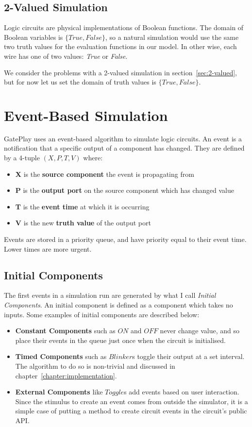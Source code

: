 \subsection{2-Valued Simulation}
Logic circuits are physical implementations of Boolean functions. The domain of Boolean variables is $\{True, False\}$, so a natural simulation would use the same two truth values for the evaluation functions in our model. In other wise, each wire has one of two values: \textit{True} or \textit{False}. 

We consider the problems with a 2-valued simulation in section~\ref{sec:2-valued}, but for now let us set the domain of truth values is $\{True, False\}$.

\section{Event-Based Simulation}
GatePlay uses an event-based algorithm to simulate logic circuits. An event is a notification that a specific output of a component has changed. They are defined by a 4-tuple $(X, P, T, V)$ where:

\begin{itemize}
	\item \textbf{X} is the \textbf{source component} the event is propagating from
	\item \textbf{P} is the \textbf{output port} on the source component which has changed value
	\item \textbf{T} is the \textbf{event time} at which it is occurring
	\item \textbf{V} is the new \textbf{truth value} of the output port
\end{itemize}

Events are stored in a priority queue, and have priority equal to their event time. Lower times are more urgent. 

\subsection{Initial Components}
\label{subsec:initial}
The first events in a simulation run are generated by what I call \textit{Initial Components}. An initial component is defined as a component which takes no inputs. Some examples of initial components are described below:

\begin{itemize}
	\item \textbf{Constant Components} such as $ON$ and $OFF$ never change value, and so place their events in the queue just once when the circuit is initialised.
	
	\item \textbf{Timed Components} such as $Blinker$s toggle their output at a set interval. The algorithm to do so is non-trivial and discussed in chapter~\ref{chapter:implementation}.
	
	\item \textbf{External Components} like $Toggle$s add events based on user interaction. Since the stimulus to create an event comes from outside the simulator, it is a simple case of putting a method to create circuit events in the circuit's public API.
\end{itemize}

